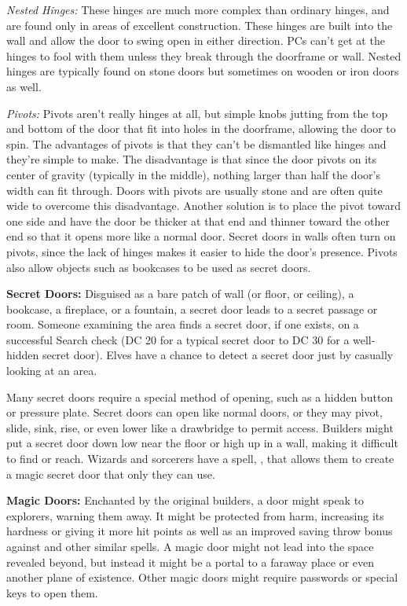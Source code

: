 \textit{Nested Hinges:} These hinges are much more complex than ordinary hinges, 
and are found only in areas of excellent construction. These hinges are built into 
the wall and allow the door to swing open in either direction. PCs can't get at 
the hinges to fool with them unless they break through the doorframe or wall. Nested 
hinges are typically found on stone doors but sometimes on wooden or iron doors 
as well. 

\textit{Pivots:} Pivots aren't really hinges at all, but simple knobs jutting from 
the top and bottom of the door that fit into holes in the doorframe, allowing the 
door to spin. The advantages of pivots is that they can't be dismantled like hinges 
and they're simple to make. The disadvantage is that since the door pivots on its 
center of gravity (typically in the middle), nothing larger than half the door's 
width can fit through. Doors with pivots are usually stone and are often quite 
wide to overcome this disadvantage. Another solution is to place the pivot toward 
one side and have the door be thicker at that end and thinner toward the other 
end so that it opens more like a normal door. Secret doors in walls often turn 
on pivots, since the lack of hinges makes it easier to hide the door's presence. 
Pivots also allow objects such as bookcases to be used as secret doors.

\textbf{Secret Doors:} Disguised as a bare patch of wall (or floor, or ceiling), 
a bookcase, a fireplace, or a fountain, a secret door leads to a secret passage 
or room. Someone examining the area finds a secret door, if one exists, on a successful 
Search check (DC 20 for a typical secret door to DC 30 for a well-hidden secret 
door). Elves have a chance to detect a secret door just by casually looking at 
an area.

Many secret doors require a special method of opening, such as a hidden button 
or pressure plate. Secret doors can open like normal doors, or they may pivot, 
slide, sink, rise, or even lower like a drawbridge to permit access. Builders might 
put a secret door down low near the floor or high up in a wall, making it difficult 
to find or reach. Wizards and sorcerers have a spell, , that 
allows them to create a magic secret door that only they can use.

\textbf{Magic Doors:} Enchanted by the original builders, a door might speak to 
explorers, warning them away. It might be protected from harm, increasing its hardness 
or giving it more hit points as well as an improved saving throw bonus against 
 and other similar spells. A magic door might not lead into 
the space revealed beyond, but instead it might be a portal to a faraway place 
or even another plane of existence. Other magic doors might require passwords or 
special keys to open them. 

